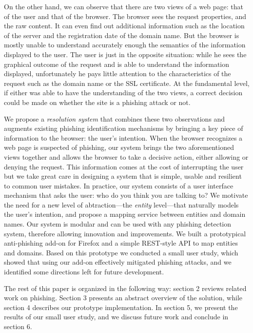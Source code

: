 \documentclass[11pt,styles/chicago,a4paper]{article}
\begin{document}
On the other hand, we can observe that there are two views of a web page: that of the user and that of the browser. The browser sees the request properties, and the raw content. It can even find out additional information such as the location of the server and the registration date of the domain name. But the browser is mostly unable to understand accurately enough the semantics of the information displayed to the user. The user is just in the opposite situation: while he sees the graphical outcome of the request and is able to understand the information displayed, unfortunately he pays little attention to the characteristics of the request such as the domain name or the SSL certificate. At the fundamental level, if either was able to have the understanding of the two views, a correct decision could be made on whether the site is a phishing attack or not. %

We propose a \emph{resolution system} that combines these two observations and augments existing phishing identification mechanisms by bringing a key piece of information to the browser: the user's intention. When the browser recognizes a web page is suspected of phishing, our system brings the two aforementioned views together and allows the browser to take a decisive action, either allowing or denying the request. This information comes at the cost of interrupting the user but we take great care in designing a system that is simple, usable and resilient to common user mistakes. In practice, our system consists of a user interface mechanism that asks the user: who do you think you are talking to? We motivate the need for a new level of abtraction---the \emph{entity} level---that naturally models the user's intention, and propose a mapping service between entities and domain names. Our system is modular and can be used with any phishing detection system, therefore allowing innovation and improvements. We built a prototypical anti-phishing add-on for Firefox and a simple REST-style API to map entities and domains. Based on this prototype we conducted a small user study, which showed that using our add-on effectively mitigated phishing attacks, and we identified some directions left for future development.

The rest of this paper is organized in the following way: section 2 reviews related work on phishing. Section 3 presents an abstract overview of the solution, while section 4 describes our prototype implementation. In section 5, we present the results of our small user study, and we discuss future work and conclude in section 6.
\end{document}
